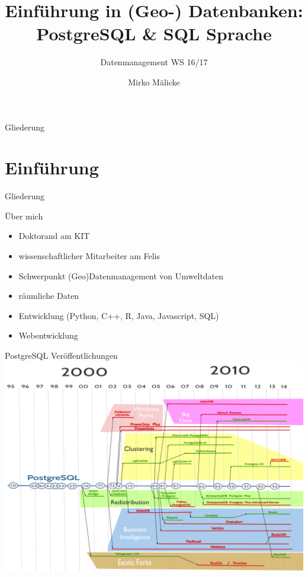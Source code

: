 \documentclass[18pt]{beamer}
\title[PostgreSQL / PostGIS]{Einführung in (Geo-) Datenbanken:\\ PostgreSQL \& SQL Sprache}
\subtitle{Datenmanagement WS 16/17}
\author{Mirko Mälicke}
\institute{Institut für Wasser und Gewässerentwicklung - Abteilung Hydrologie}
\begin{document}

\begin{frame}
\titlepage
\end{frame}

\begin{frame}{Gliederung}
\tableofcontents
\end{frame}

\section{Einführung}

\begin{frame}{Gliederung}
\tableofcontents[currentsection]
\end{frame}\begin{frame}{Über mich}
\begin{itemize}
\item Doktorand am KIT 
\item wissenschaftlicher Mitarbeiter am Felis
\item Schwerpunkt (Geo)Datenmanagement von Umweltdaten
\item räumliche Daten
\item Entwicklung (Python, C++, R, Java, Javascript, SQL)
\item Webentwicklung
\end{itemize}
\end{frame}

\begin{frame}{PostgreSQL Veröffentlichungen}
\includegraphics[width=.88\textwidth]{images/TimelinePostgresql}
\end{frame}
\end{document}
